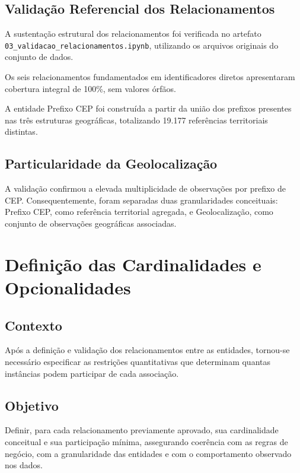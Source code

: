 \documentclass[12pt,a4paper]{article}
\begin{document}
	\subsection{Validação Referencial dos Relacionamentos}
	
	A sustentação estrutural dos relacionamentos foi verificada no artefato
	\nolinkurl{03_validacao_relacionamentos.ipynb}, utilizando os arquivos originais
	do conjunto de dados.
	
	Os seis relacionamentos fundamentados em identificadores diretos apresentaram
	cobertura integral de 100\%, sem valores órfãos.
	
	A entidade Prefixo CEP foi construída a partir da união dos prefixos presentes
	nas três estruturas geográficas, totalizando 19.177 referências territoriais
	distintas.
	
	\subsection{Particularidade da Geolocalização}
	
	A validação confirmou a elevada multiplicidade de observações por prefixo de
	CEP. Consequentemente, foram separadas duas granularidades conceituais:
	Prefixo CEP, como referência territorial agregada, e Geolocalização, como
	conjunto de observações geográficas associadas.
	
	\section{Definição das Cardinalidades e Opcionalidades}
	
	\subsection{Contexto}
	
	Após a definição e validação dos relacionamentos entre as entidades, tornou-se
	necessário especificar as restrições quantitativas que determinam quantas
	instâncias podem participar de cada associação.
	
	\subsection{Objetivo}
	
	Definir, para cada relacionamento previamente aprovado, sua cardinalidade
	conceitual e sua participação mínima, assegurando coerência com as regras de
	negócio, com a granularidade das entidades e com o comportamento observado nos
	dados.
	
\end{document}

